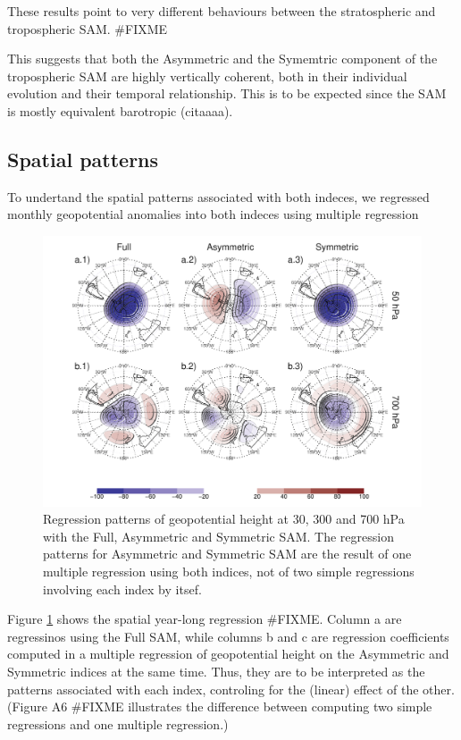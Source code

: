 \documentclass[twocol]{ametsocV5}
\begin{document}
These results point to very different behaviours between the
stratospheric and tropospheric SAM. \#FIXME

This suggests that both the Asymmetric and the Symemtric component of
the tropospheric SAM are highly vertically coherent, both in their
individual evolution and their temporal relationship. This is to be
expected since the SAM is mostly equivalent barotropic (citaaaa).

\subsection{Spatial patterns}

To undertand the spatial patterns associated with both indeces, we
regressed monthly geopotential anomalies into both indeces using
multiple regression

\begin{figure}
\includegraphics{2d-regr-1} \caption[Regression patterns of geopotential height at 30, 300 and 700 hPa with the Full, Asymmetric and Symmetric SAM]{Regression patterns of geopotential height at 30, 300 and 700 hPa with the Full, Asymmetric and Symmetric SAM. The regression patterns for Asymmetric and Symmetric SAM are the result of one multiple regression using both indices, not of two simple regressions involving each index by itsef.}\label{fig:2d-regr}
\end{figure}

Figure \ref{fig:2d-regr} shows the spatial year-long regression \#FIXME.
Column a are regressinos using the Full SAM, while columns b and c are
regression coefficients computed in a multiple regression of
geopotential height on the Asymmetric and Symmetric indices at the same
time. Thus, they are to be interpreted as the patterns associated with
each index, controling for the (linear) effect of the other. (Figure A6
\#FIXME illustrates the difference between computing two simple
regressions and one multiple regression.)
\end{document}
